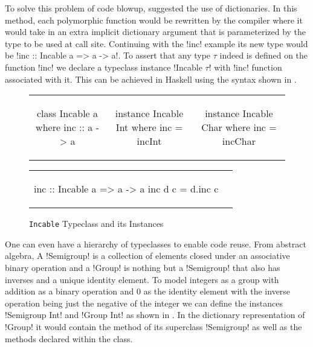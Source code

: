\documentclass[format=sigplan,manuscript,review,screen, nonacm]{acmart}
\begin{document}
To solve this problem of code blowup, \cite{wadler_polymorphism_1989} suggested the use of dictionaries.
In this method, each polymorphic function would be rewritten by the compiler where it
would take in an extra implicit dictionary argument that is parameterized by the type to be used at call site.
Continuing with the !inc! example its new type would be !inc :: Incable a => a -> a!.
To assert that any type \texttt{$\tau$} indeed is defined on the function !inc! we declare
a typeclass instance !Incable $\tau$! with !inc! function associated with it.
This can be achieved in Haskell using the syntax shown in .

\begin{figure}[ht]
  \begin{tabular}{c c c}
    \begin{code}
      class Incable a where
        inc :: a -> a
    \end{code}&%
    \begin{code}
      instance Incable Int where
        inc = incInt
    \end{code}&%
    \begin{code}
      instance Incable Char where
        inc = incChar
    \end{code}
  \end{tabular}
  \begin{tabular}{c c}
    \begin{code}
      inc :: Incable a => a -> a
      inc d c = d.inc c
    \end{code}&%
  \end{tabular}
  \caption{\texttt{Incable} Typeclass and its Instances}
  \label{fig:typeclass-example}
\end{figure}

One can even have a hierarchy of typeclasses to enable code reuse.
From abstract algebra, A !Semigroup! is a collection of
elements closed under an associative binary operation and a !Group! is nothing but a !Semigroup!
that also has inverses and a unique identity element. To model integers
as a group with addition as a binary operation and $0$ as the identity element with the inverse operation
being just the negative of the integer we can define the instances !Semigroup Int! and !Group Int!
as shown in . In the dictionary representation of !Group! it would contain the method
of its superclass !Semigroup! as well as the methods declared within the class.
\end{document}
